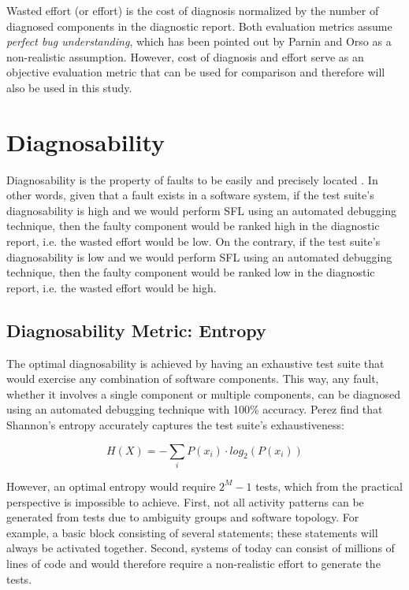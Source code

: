 \documentclass[twoside,a4paper,11pt]{memoir}
\begin{document}
Wasted effort (or effort) is the cost of diagnosis normalized by the number of diagnosed components in the diagnostic report.
Both evaluation metrics assume \emph{perfect bug understanding}, which has been pointed out by Parnin and Orso \cite{Parnin:2011:ADT:2001420.2001445} as a non-realistic assumption.
However, cost of diagnosis and effort serve as an objective evaluation metric that can be used for comparison and therefore will also be used in this study.

\section{Diagnosability}
Diagnosability is the property of faults to be easily and precisely located \cite{730889}.
In other words, given that a fault exists in a software system, if the test suite's diagnosability is high and we would perform SFL using an automated debugging technique, then the faulty component would be ranked high in the diagnostic report, i.e. the wasted effort would be low.
On the contrary, if the test suite's diagnosability is low and we would perform SFL using an automated debugging technique, then the faulty component would be ranked low in the diagnostic report, i.e. the wasted effort would be high.

\subsection{Diagnosability Metric: Entropy}
The optimal diagnosability is achieved by having an exhaustive test suite that would exercise any combination of software components.
This way, any fault, whether it involves a single component or multiple components, can be diagnosed using an automated debugging technique with 100\% accuracy.
Perez \etal \cite{DBLP:conf/icse/PerezAD17} find that Shannon's entropy accurately captures the test suite's exhaustiveness:

\begin{equation}
  H(X) = - \sum_i P(x_i) \cdot log_2(P(x_i))
\end{equation}

However, an optimal entropy would require $2^M -1$ tests, which from the practical perspective is impossible to achieve.
First, not all activity patterns can be generated from tests due to ambiguity groups and software topology.
For example, a basic block consisting of several statements; these statements will always be activated together.
Second, systems of today can consist of millions of lines of code and would therefore require a non-realistic effort to generate the tests.
\end{document}
